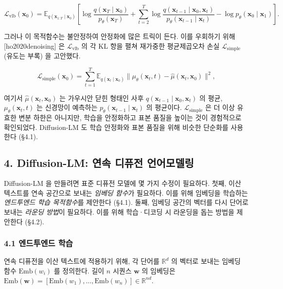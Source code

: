 \documentclass[
]{article}
\begin{document}
\[
\mathcal{L}_\text{vlb}(\mathbf{x}_0) = \mathbb{E}_{q(\mathbf{x}_{1:T} \mid \mathbf{x}_0)} \!\left[ \log\frac{q(\mathbf{x}_T \mid \mathbf{x}_0)}{p_\theta(\mathbf{x}_T)} + \sum_{t=2}^{T} \log\frac{q(\mathbf{x}_{t-1} \mid \mathbf{x}_0, \mathbf{x}_t)}{p_\theta(\mathbf{x}_{t-1} \mid \mathbf{x}_t)} - \log p_\theta(\mathbf{x}_0 \mid \mathbf{x}_1) \right].
\]

그러나 이 목적함수는 불안정하여 안정화에 많은 트릭이 든다. 이를 우회하기
위해 {[}ho2020denoising{]} 은 \(\mathcal{L}_\text{vlb}\) 의 각 KL 항을
펼쳐 재가중한 평균제곱오차 손실 \(\mathcal{L}_\text{simple}\) (유도는
부록) 을 고안했다.

\[
\mathcal{L}_\text{simple}(\mathbf{x}_0) = \sum_{t=1}^{T} \mathbb{E}_{q(\mathbf{x}_t \mid \mathbf{x}_0)} \big\| \mu_\theta(\mathbf{x}_t, t) - \hat\mu(\mathbf{x}_t, \mathbf{x}_0) \big\|^2,
\]

여기서 \(\hat\mu(\mathbf{x}_t, \mathbf{x}_0)\) 는 가우시안 닫힌 형태인
사후 \(q(\mathbf{x}_{t-1} \mid \mathbf{x}_0, \mathbf{x}_t)\) 의 평균,
\(\mu_\theta(\mathbf{x}_t, t)\) 는 신경망이 예측하는
\(p_\theta(\mathbf{x}_{t-1} \mid \mathbf{x}_t)\) 의 평균이다.
\(\mathcal{L}_\text{simple}\) 은 더 이상 유효한 변분 하한은 아니지만,
학습을 안정화하고 표본 품질을 높이는 것이 경험적으로 확인되었다.
Diffusion-LM 도 학습 안정화와 표본 품질을 위해 비슷한 단순화를 사용한다
(§4.1).

\hypertarget{diffusion-lm-uxc5f0uxc18d-uxb514uxd4e8uxc804-uxc5b8uxc5b4uxbaa8uxb378uxb9c1}{%
\subsection{4. Diffusion-LM: 연속 디퓨전
언어모델링}\label{diffusion-lm-uxc5f0uxc18d-uxb514uxd4e8uxc804-uxc5b8uxc5b4uxbaa8uxb378uxb9c1}}

Diffusion-LM 을 만들려면 표준 디퓨전 모델에 몇 가지 수정이 필요하다.
첫째, 이산 텍스트를 연속 공간으로 보내는 \emph{임베딩 함수}가 필요하다.
이를 위해 임베딩을 학습하는 \emph{엔드투엔드 학습 목적함수}를 제안한다
(§4.1). 둘째, 임베딩 공간의 벡터를 다시 단어로 보내는 \emph{라운딩
방법}이 필요하다. 이를 위해 학습·디코딩 시 라운딩을 돕는 방법을 제안한다
(§4.2).

\hypertarget{uxc5d4uxb4dcuxd22cuxc5d4uxb4dc-uxd559uxc2b5}{%
\subsubsection{4.1 엔드투엔드
학습}\label{uxc5d4uxb4dcuxd22cuxc5d4uxb4dc-uxd559uxc2b5}}

연속 디퓨전을 이산 텍스트에 적용하기 위해, 각 단어를 \(\mathbb{R}^d\) 의
벡터로 보내는 임베딩 함수 \(\mathrm{Emb}(w_i)\) 를 정의한다. 길이 \(n\)
시퀀스 \(\mathbf{w}\) 의 임베딩은
\(\mathrm{Emb}(\mathbf{w}) = [\mathrm{Emb}(w_1), \dots, \mathrm{Emb}(w_n)] \in \mathbb{R}^{nd}\).
\end{document}
